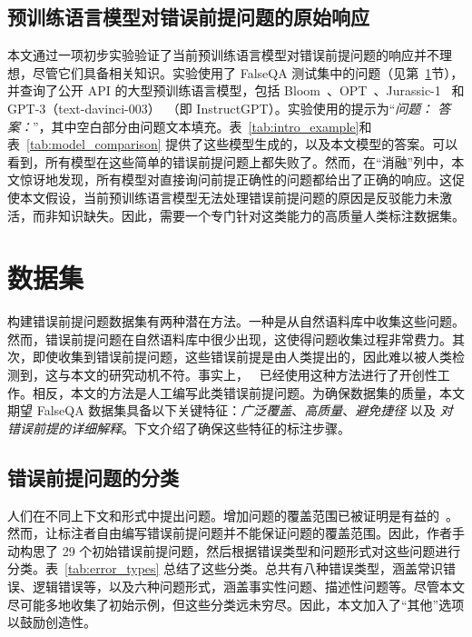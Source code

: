 \subsection{预训练语言模型对错误前提问题的原始响应}
\label{sec:pilot}
本文通过一项初步实验验证了当前预训练语言模型对错误前提问题的响应并不理想，尽管它们具备相关知识。实验使用了 FalseQA 测试集中的问题（见第~\ref{sec:dataset}节），并查询了公开 API 的大型预训练语言模型，包括 Bloom~\cite{scao2022bloom}、OPT~\cite{zhang2022opt}、Jurassic-1~\cite{lieber2021jurassic} 和 GPT-3（text-davinci-003）~\cite{brown2020language}（即 InstructGPT）。实验使用的提示为“\textit{问题：\makebox[6mm]{\hrulefill} 答案：}”，其中空白部分由问题文本填充。表~\ref{tab:intro_example}和表~\ref{tab:model_comparison} 提供了这些模型生成的，以及本文模型的答案。可以看到，所有模型在这些简单的错误前提问题上都失败了。然而，在“消融”列中，本文惊讶地发现，所有模型对直接询问前提正确性的问题都给出了正确的响应。这促使本文假设，当前预训练语言模型无法处理错误前提问题的原因是反驳能力未激活，而非知识缺失。因此，需要一个专门针对这类能力的高质量人类标注数据集。

\section{数据集}
\label{sec:dataset}
构建错误前提问题数据集有两种潜在方法。一种是从自然语料库中收集这些问题。然而，错误前提问题在自然语料库中很少出现，这使得问题收集过程非常费力。其次，即使收集到错误前提问题，这些错误前提是由人类提出的，因此难以被人类检测到，这与本文的研究动机不符。事实上，~\citet{min2022crepe} 已经使用这种方法进行了开创性工作。相反，本文的方法是人工编写此类错误前提问题。为确保数据集的质量，本文期望 FalseQA 数据集具备以下关键特征：\textit{广泛覆盖}、\textit{高质量}、\textit{避免捷径} 以及 \textit{对错误前提的详细解释}。下文介绍了确保这些特征的标注步骤。

\subsection{错误前提问题的分类}
人们在不同上下文和形式中提出问题。增加问题的覆盖范围已被证明是有益的~\cite{khashabi-etal-2020-unifiedqa}。然而，让标注者自由编写错误前提问题并不能保证问题的覆盖范围。因此，作者手动构思了 29 个初始错误前提问题，然后根据错误类型和问题形式对这些问题进行分类。表~\ref{tab:error_types} 总结了这些分类。总共有八种错误类型，涵盖常识错误、逻辑错误等，以及六种问题形式，涵盖事实性问题、描述性问题等。尽管本文尽可能多地收集了初始示例，但这些分类远未穷尽。因此，本文加入了“其他”选项以鼓励创造性。

